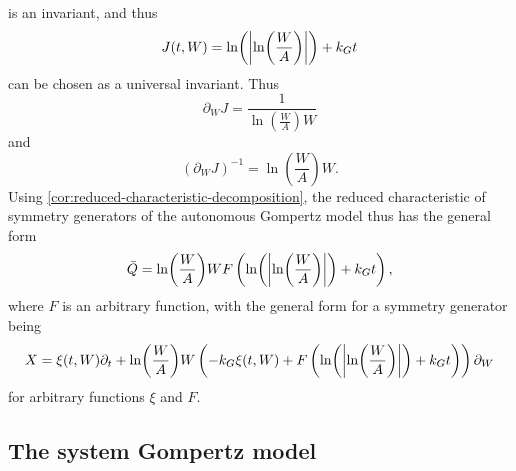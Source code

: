 is an invariant, and thus
\begin{equation}
  J(t, W) = \ln(\abs{\ln(\frac{W}{A})}) + k_G t
\end{equation}
can be chosen as a universal invariant.
Thus
\begin{equation}
  \partial_W J = \frac{1}{\ln(\frac{W}{A}) W}
\end{equation}
and
\begin{equation}
  \left(\partial_W J\right)^{-1} = \ln(\frac{W}{A}) W.
\end{equation}
Using \cref{cor:reduced-characteristic-decomposition}, the reduced characteristic of symmetry generators of the autonomous Gompertz model thus has the general form
\begin{equation}
  \bar{Q} = \ln(\frac{W}{A}) W F\left(\ln(\abs{\ln(\frac{W}{A})}) + k_G t\right),
\end{equation}
where \(F\) is an arbitrary function, with the general form for a symmetry generator being
\begin{equation}
  X = \xi(t, W) \partial_t + \ln(\frac{W}{A}) W \left(-k_G \xi(t, W) + F\left(\ln(\abs{\ln(\frac{W}{A})}) + k_G t\right)\right) \partial_W
\end{equation}
for arbitrary functions \(\xi\) and \(F\).

\subsection{The system Gompertz model}

